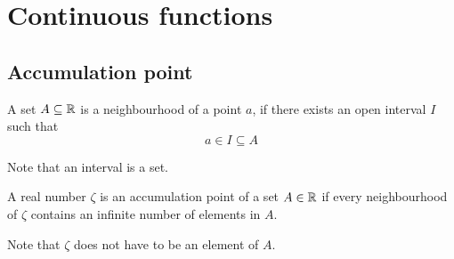 \chapter{Continuous functions}


\section{Accumulation point}
\begin{definition}[Neighbourhood]
  A set $A \subseteq \mathbb{R}$ is a neighbourhood of a point $a$, if there exists an open interval $I$ such that
  \[
    a \in I \subseteq A
  \]
\end{definition}
Note that an interval is a set.
\begin{definition}
  A real number $\zeta$ is an accumulation point of a set $A \in \mathbb{R}$ if every neighbourhood of $\zeta$ contains an infinite number of elements in $A$.
\end{definition}
Note that $\zeta$ does not have to be an element of $A$.
